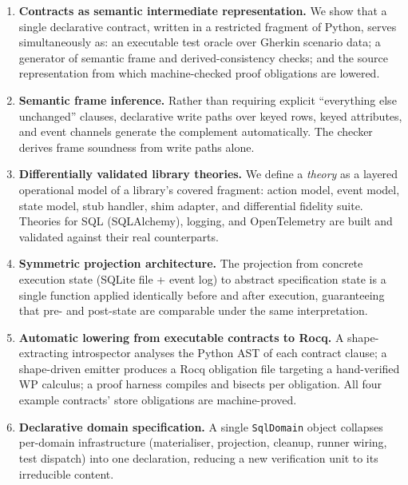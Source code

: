 \documentclass[11pt,a4paper]{article}
\begin{document}
\begin{enumerate}[label=\textbf{C\arabic*}]
\item \textbf{Contracts as semantic intermediate representation.}
  We show that a single declarative contract, written in a restricted
  fragment of Python, serves simultaneously as: an executable test
  oracle over Gherkin scenario data; a generator of semantic frame
  and derived-consistency checks; and the source representation from
  which machine-checked proof obligations are lowered.

\item \textbf{Semantic frame inference.}
  Rather than requiring explicit ``everything else unchanged''
  clauses, declarative write paths over keyed rows, keyed attributes,
  and event channels generate the complement automatically.  The
  checker derives frame soundness from write paths alone.

\item \textbf{Differentially validated library theories.}
  We define a \emph{theory} as a layered operational model of a
  library's covered fragment: action model, event model, state model,
  stub handler, shim adapter, and differential fidelity suite.
  Theories for SQL (SQLAlchemy), logging, and OpenTelemetry are
  built and validated against their real counterparts.

\item \textbf{Symmetric projection architecture.}
  The projection from concrete execution state (SQLite file + event
  log) to abstract specification state is a single function applied
  identically before and after execution, guaranteeing that pre- and
  post-state are comparable under the same interpretation.

\item \textbf{Automatic lowering from executable contracts to Rocq.}
  A shape-extracting introspector analyses the Python AST of each
  contract clause; a shape-driven emitter produces a Rocq obligation
  file targeting a hand-verified WP calculus; a proof harness compiles
  and bisects per obligation.  All four example contracts' store
  obligations are machine-proved.

\item \textbf{Declarative domain specification.}
  A single \texttt{SqlDomain} object collapses per-domain
  infrastructure (materialiser, projection, cleanup, runner wiring,
  test dispatch) into one declaration, reducing a new verification
  unit to its irreducible content.
\end{enumerate}
\end{document}
